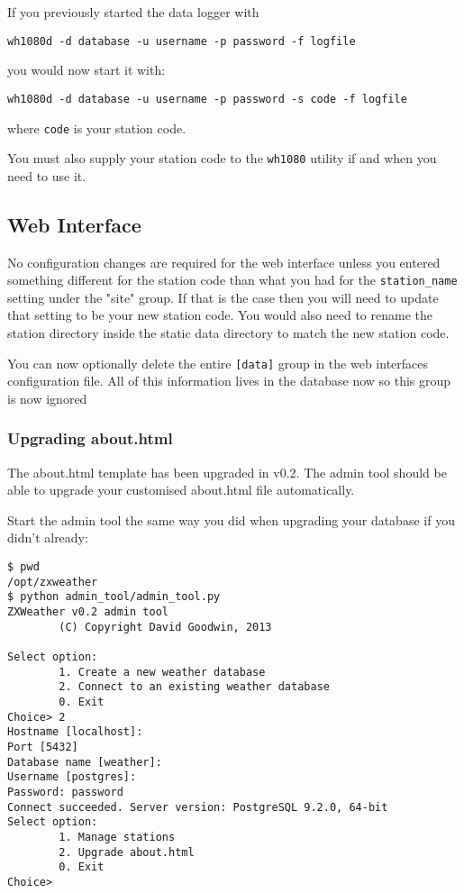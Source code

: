 \documentclass[a4paper,10pt,draft]{book}
\begin{document}
If you previously started the data logger with
\begin{verbatim}
wh1080d -d database -u username -p password -f logfile
\end{verbatim}

you would now start it with:
\begin{verbatim}
wh1080d -d database -u username -p password -s code -f logfile
\end{verbatim}
where \verb|code| is your station code.

You must also supply your station code to the \verb|wh1080| utility if and when you need to use it.

\subsection{Web Interface}
No configuration changes are required for the web interface unless you entered something different for the station code than what you had for the \verb|station_name| setting under the "site" group. If that is the case then you will need to update that setting to be your new station code. You would also need to rename the station directory inside the static data directory to match the new station code.

You can now optionally delete the entire \verb|[data]| group in the web interfaces configuration file. All of this information lives in the database now so this group is now ignored

\subsubsection{Upgrading about.html}
The about.html template has been upgraded in v0.2. The admin tool should be able to upgrade your customised about.html file automatically.

Start the admin tool the same way you did when upgrading your database if you didn't already:
\begin{verbatim}
$ pwd
/opt/zxweather
$ python admin_tool/admin_tool.py
ZXWeather v0.2 admin tool
        (C) Copyright David Goodwin, 2013

Select option:
        1. Create a new weather database
        2. Connect to an existing weather database
        0. Exit
Choice> 2
Hostname [localhost]:
Port [5432]
Database name [weather]: 
Username [postgres]:
Password: password
Connect succeeded. Server version: PostgreSQL 9.2.0, 64-bit
Select option:
        1. Manage stations
        2. Upgrade about.html
        0. Exit
Choice>
\end{verbatim}
\end{document}
